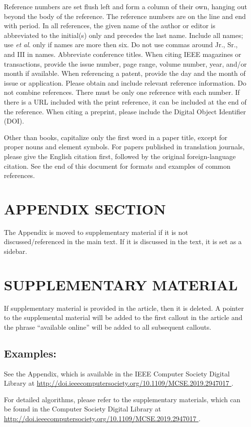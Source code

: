 \documentclass{IEEEcsmag}
\begin{document}
Reference numbers are set flush left and form a column of their own, hanging out beyond the body of the reference. The reference numbers are on the line and end with period. In all references, the given name of the author or editor is abbreviated to the initial(s) only and precedes the last name. Include all names; use \emph{et al}. only if names are more then six. Do not use commas around Jr., Sr., and III in names. Abbreviate conference titles. When citing IEEE magazines or transactions, provide the issue number, page range, volume number, year, and/or month if available. When referencing a patent, provide the day and the month of issue or application. Please obtain and include relevant reference information. Do not combine references. There must be only one reference with each number. If there is a URL included with the print reference, it can be included at the end of the reference. When citing a preprint, please include the Digital Object Identifier (DOI).

Other than books, capitalize only the first word in a paper title, except for proper nouns and element symbols. For papers published in translation journals, please give the English citation first, followed by the original foreign-language citation. See the end of this document for formats and examples of common references.\vspace*{4pt}

\section{APPENDIX SECTION}

 The Appendix is moved to supplementary material if it is not discussed/referenced in the main text. If it is discussed in the text, it is set as a sidebar.  


\section{SUPPLEMENTARY MATERIAL}

If supplementary material is provided in the article, then it is deleted. A pointer to the supplemental material will be added to the first callout in the article and the phrase “available online” will be added to all subsequent callouts.

\subsection{Examples:}

See the Appendix, which is available in the IEEE Computer Society Digital Library at \url{http://doi.ieeecomputersociety.org/10.1109/MCSE.2019.2947017 }.

For detailed algorithms, please refer to the supplementary materials, which can be found in the Computer Society Digital Library at \url{http://doi.ieeecomputersociety.org/10.1109/MCSE.2019.2947017 }.\vspace*{-8pt}
\end{document}
